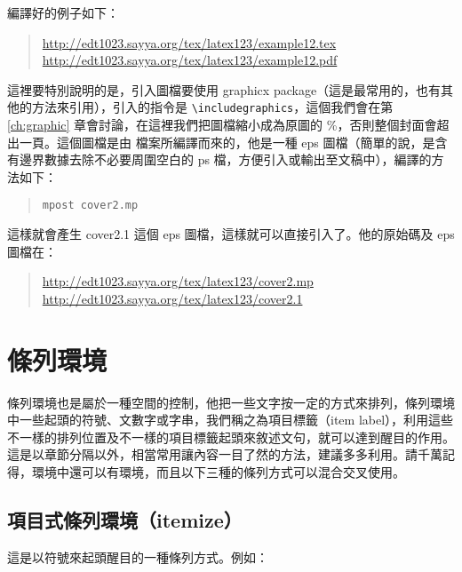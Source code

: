 編譯好的例子如下：

\begin{quote}
   \url{http://edt1023.sayya.org/tex/latex123/example12.tex}\\
   \url{http://edt1023.sayya.org/tex/latex123/example12.pdf}
\end{quote}

這裡要特別說明的是，引入圖檔要使用 \textsf{graphicx} package（這是最常用的，也有其他的方法來引用），引入的指令是 \verb=\includegraphics=，這個我們會在第 \ref{ch:graphic} 章會討論，在這裡我們把圖檔縮小成為原圖的 {\%}，否則整個封面會超出一頁。這個圖檔是由 \MP{} 檔案所編譯而來的，他是一種 eps 圖檔（簡單的說，是含有邊界數據去除不必要周圍空白的 ps 檔，方便引入或輸出至文稿中），編譯的方法如下：

\begin{quote}
   \begin{verbatim}
mpost cover2.mp
\end{verbatim}
\end{quote}

這樣就會產生 {\ttfamily cover2.1} 這個 eps 圖檔，這樣就可以直接引入了。他的原始碼及 eps 圖檔在：

\begin{quote}
   \url{http://edt1023.sayya.org/tex/latex123/cover2.mp}\\
   \url{http://edt1023.sayya.org/tex/latex123/cover2.1}
\end{quote}


\section{條列環境}

條列環境也是屬於一種空間的控制，他把一些文字按一定的方式來排列，條列環境中一些起頭的符號、文數字或字串，我們稱之為項目標籤（item label），利用這些不一樣的排列位置及不一樣的項目標籤起頭來敘述文句，就可以達到醒目的作用。這是以章節分隔以外，相當常用讓內容一目了然的方法，建議多多利用。請千萬記得，環境中還可以有環境，而且以下三種的條列方式可以混合交叉使用。

\subsection{項目式條列環境（itemize）}

這是以符號來起頭醒目的一種條列方式。例如：

